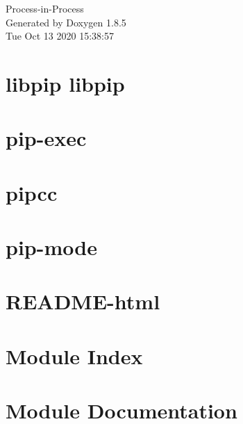 \documentclass[twoside]{book}
\newcommand{\clearemptydoublepage}{%
  \newpage{\pagestyle{empty}\cleardoublepage}%
}
\begin{document}
\hypersetup{pageanchor=false}
\begin{titlepage}
\vspace*{7cm}
\begin{center}%
{\Large Process-\/in-\/\-Process }\\
\vspace*{1cm}
{\large Generated by Doxygen 1.8.5}\\
\vspace*{0.5cm}
{\small Tue Oct 13 2020 15:38:57}\\
\end{center}
\end{titlepage}
\clearemptydoublepage
\tableofcontents
\clearemptydoublepage
{}
\hypersetup{pageanchor=true}

\chapter{libpip libpip}
\label{index}\hypertarget{index}{}
\chapter{pip-\/exec}
\label{pip-exec}
\hypertarget{pip-exec}{}

\chapter{pipcc}
\label{pipcc}
\hypertarget{pipcc}{}

\chapter{pip-\/mode}
\label{pip-mode}
\hypertarget{pip-mode}{}

\chapter{R\-E\-A\-D\-M\-E-\/html}
\label{md_README-html}
\hypertarget{md_README-html}{}

\chapter{Module Index}

\chapter{Module Documentation}













\newpage
{}
{}
\printindex
\end{document}
